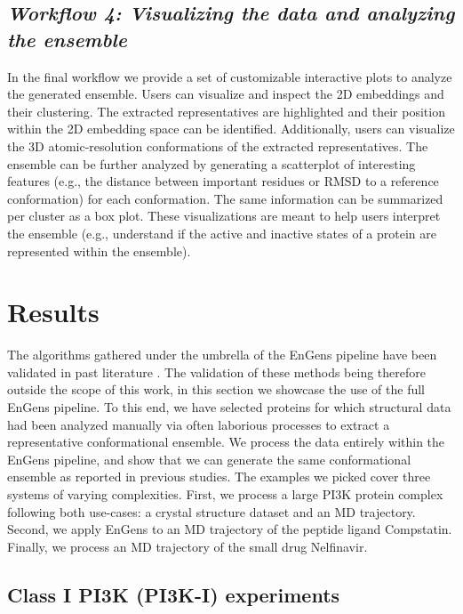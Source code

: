 \documentclass[unnumsec,webpdf,contemporary,large,numsquare]{oup-authoring-template}%
\theoremstyle{thmstyleone}%
\theoremstyle{thmstyletwo}%
\theoremstyle{thmstylethree}%
\begin{document}
\subsection{\textit{\textbf{Workflow 4:} Visualizing the data and analyzing the ensemble}}\label{wf1}

In the final workflow we provide a set of customizable interactive plots to analyze the generated ensemble. Users can visualize and inspect the 2D embeddings and their clustering. The extracted representatives are highlighted and their position within the 2D embedding space can be identified. Additionally, users can visualize the 3D atomic-resolution conformations of the extracted representatives. The ensemble can be further analyzed by generating a scatterplot of interesting features (e.g., the distance between important residues or RMSD to a reference conformation) for each conformation. The same information can be summarized per cluster as a box plot. These visualizations are meant to help users interpret the ensemble (e.g., understand if the active and inactive states of a protein are represented within the ensemble).


\section{Results}

The algorithms gathered under the umbrella of the EnGens pipeline have been validated in past literature \citep{scherer_pyemma_2015, chen_nonlinear_2019, trozzi_umap_2021, perez-hernandez_identification_2013, schwantes_modeling_2015}. The validation of these methods being therefore outside the scope of this work, in this section we showcase the use of the full EnGens pipeline. To this end, we have selected proteins for which structural data had been analyzed manually via often laborious processes to extract a representative conformational ensemble. We process the data entirely within the EnGens pipeline, and show that we can generate the same conformational ensemble as reported in previous studies. The examples we picked cover three systems of varying complexities. First, we process a large PI3K protein complex following both use-cases: a crystal structure dataset and an MD trajectory. Second, we apply EnGens to an MD trajectory of the peptide ligand Compstatin. Finally, we process an MD trajectory of the small drug Nelfinavir.


\subsection{Class I PI3K (PI3K-I) experiments}
\end{document}
